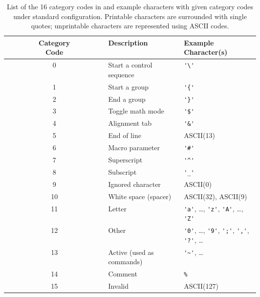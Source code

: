 \begin{table}[tb]
  \centering
  \footnotesize
  \begin{tabular}{|c|>{\centering\arraybackslash}m{0.3\linewidth}|>{\centering\arraybackslash}m{0.3\linewidth}|}
    \hline
    \makecell{Category\\Code} & Description & \makecell{Example\\Character(s)} \\ \hline
    0 & Start a control sequence  & \verb|'\'| \\ \hline
    1 & Start a group & \verb|'{'| \\ \hline
    2 & End a group & \verb|'}'| \\ \hline
    3 & Toggle math mode & \verb|'$'| \\ \hline
    4 & Alignment tab & \verb|'&'| \\ \hline
    5 & End of line & ASCII(13) \\ \hline
    6 & Macro parameter & \verb|'#'| \\ \hline
    7 & Superscript & \verb|'^'| \\ \hline
    8 & Subscript & \verb|'_'| \\ \hline
    9 & Ignored character & ASCII(0) \\ \hline
    10 & White space (spacer) & ASCII(32), ASCII(9) \\ \hline
    11 & Letter & \verb|'a'|, \ldots, \verb|'z'|, \verb|'A'|, \ldots, \verb|'Z'|\\ \hline
    12 & Other & \verb|'0'|, \ldots, \verb|'9'|, \verb|';'|, \verb|','|, \verb|'?'|, \ldots\\ \hline
    13 & Active (used as commands) & \verb|'~'|, \ldots\\ \hline
    14 & Comment & \verb|%| \\ \hline
    15 & Invalid & ASCII(127) \\ \hline
  \end{tabular}
  \caption{List of the 16 category codes in \LT{} and example characters with given category codes under standard \LT{} configuration. Printable characters are surrounded with single quotes; unprintable characters are represented using ASCII codes.}
  \label{tab:cat-code}
\end{table}


